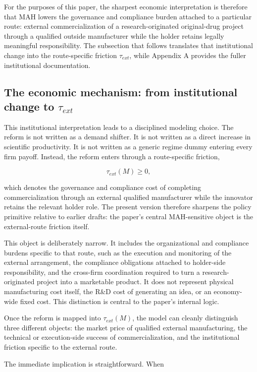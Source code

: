\documentclass[12pt]{article}
\begin{document}
For the purposes of this paper, the sharpest economic interpretation is therefore that MAH lowers the governance and compliance burden attached to a particular route: external commercialization of a research-originated original-drug project through a qualified outside manufacturer while the holder retains legally meaningful responsibility. The subsection that follows translates that institutional change into the route-specific friction $\tau_{ext}$, while Appendix A provides the fuller institutional documentation.

\subsection{The economic mechanism: from institutional change to \texorpdfstring{$\tau_{ext}$}{tau-ext}}

This institutional interpretation leads to a disciplined modeling choice. The reform is not written as a demand shifter. It is not written as a direct increase in scientific productivity. It is not written as a generic regime dummy entering every firm payoff. Instead, the reform enters through a route-specific friction,

\[
\tau_{ext}(M)\ge 0,
\]

which denotes the governance and compliance cost of completing commercialization through an external qualified manufacturer while the innovator retains the relevant holder role. The present version therefore sharpens the policy primitive relative to earlier drafts: the paper's central MAH-sensitive object is the external-route friction itself.

This object is deliberately narrow. It includes the organizational and compliance burdens specific to that route, such as the execution and monitoring of the external arrangement, the compliance obligations attached to holder-side responsibility, and the cross-firm coordination required to turn a research-originated project into a marketable product. It does not represent physical manufacturing cost itself, the R\&D cost of generating an idea, or an economy-wide fixed cost. This distinction is central to the paper's internal logic. 

Once the reform is mapped into $\tau_{ext}(M)$, the model can cleanly distinguish three different objects: the market price of qualified external manufacturing, the technical or execution-side success of commercialization, and the institutional friction specific to the external route.

The immediate implication is straightforward. When
\end{document}
